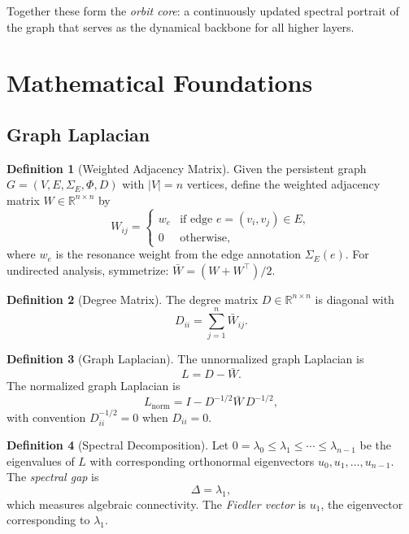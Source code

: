 \documentclass[11pt,a4paper,twoside]{article}
\theoremstyle{definition}
\newtheorem{definition}{Definition}[section]
\theoremstyle{plain}
\theoremstyle{remark}
\newcommand{\RR}{\mathbb{R}}
\begin{document}
Together these form the \emph{orbit core}: a continuously updated
spectral portrait of the graph that serves as the dynamical backbone
for all higher layers.


\section{Mathematical Foundations}\label{sec:topo:math}

\subsection{Graph Laplacian}

\begin{definition}[Weighted Adjacency Matrix]\label{def:adjmatrix}
Given the persistent graph $G = (V, E, \Sigma_E, \Phi, D)$ with
$|V| = n$ vertices, define the weighted adjacency matrix
$W \in \RR^{n \times n}$ by
\[
  W_{ij} =
  \begin{cases}
    w_e & \text{if edge } e = (v_i, v_j) \in E, \\
    0 & \text{otherwise},
  \end{cases}
\]
where $w_e$ is the resonance weight from the edge annotation
$\Sigma_E(e)$. For undirected analysis, symmetrize:
$\bar{W} = (W + W^\top) / 2$.
\end{definition}

\begin{definition}[Degree Matrix]\label{def:degmatrix}
The degree matrix $D \in \RR^{n \times n}$ is diagonal with
\[
  D_{ii} = \sum_{j=1}^{n} \bar{W}_{ij}.
\]
\end{definition}

\begin{definition}[Graph Laplacian]\label{def:laplacian}
The unnormalized graph Laplacian is
\[
  L = D - \bar{W}.
\]
The normalized graph Laplacian is
\[
  L_{\mathrm{norm}} = I - D^{-1/2} \bar{W}\, D^{-1/2},
\]
with convention $D^{-1/2}_{ii} = 0$ when $D_{ii} = 0$.
\end{definition}

\begin{definition}[Spectral Decomposition]\label{def:spectral}
Let $0 = \lambda_0 \le \lambda_1 \le \cdots \le \lambda_{n-1}$ be the
eigenvalues of $L$ with corresponding orthonormal eigenvectors
$u_0, u_1, \ldots, u_{n-1}$. The \emph{spectral gap} is
\[
  \Delta = \lambda_1,
\]
which measures algebraic connectivity. The \emph{Fiedler vector} is
$u_1$, the eigenvector corresponding to $\lambda_1$.
\end{definition}
\end{document}

